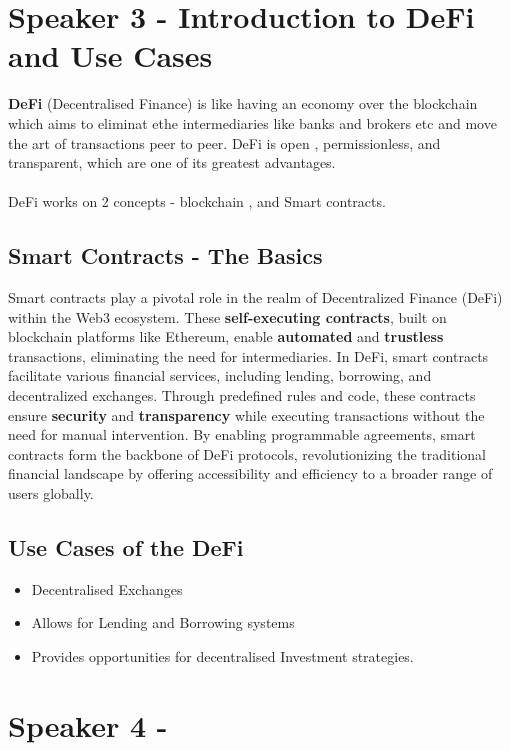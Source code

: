\documentclass[a4paper,30pt]{report}
\begin{document}
  \chapter{Speaker 3 - Introduction to DeFi and Use Cases}
      \textbf{DeFi} (Decentralised Finance) is like having an economy over the blockchain which aims to eliminat ethe intermediaries like banks and brokers etc and move the art of transactions peer to peer.
      DeFi is open , permissionless, and transparent, which are one of its greatest advantages.\\\\
      DeFi works on 2 concepts - blockchain , and Smart contracts.

      \section{Smart Contracts - The Basics}
          Smart contracts play a pivotal role in the realm of Decentralized Finance (DeFi) within the Web3 ecosystem. These \textbf{self-executing contracts}, built on blockchain platforms like Ethereum, enable \textbf{automated} and \textbf{trustless} transactions, eliminating the need for intermediaries. In DeFi, smart contracts facilitate various financial services, including lending, borrowing, and decentralized exchanges. Through predefined rules and code, these contracts ensure \textbf{security} and \textbf{transparency} while executing transactions without the need for manual intervention. By enabling programmable agreements, smart contracts form the backbone of DeFi protocols, revolutionizing the traditional financial landscape by offering accessibility and efficiency to a broader range of users globally.\\
      \section{Use Cases of the DeFi}
          \begin{itemize}
            \item Decentralised Exchanges
            \item Allows for Lending and Borrowing systems
            \item Provides opportunities for decentralised Investment strategies.
          \end{itemize}
  \chapter{Speaker 4 - }

  \chapter{}
\end{document}
